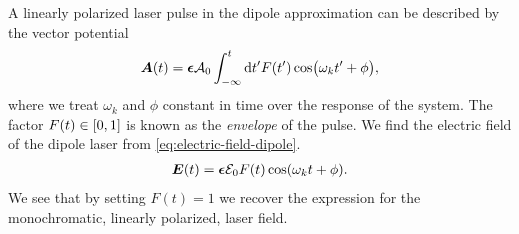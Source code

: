         A linearly polarized laser pulse in the dipole approximation can be
        described by the vector potential \cite{joachain2012atoms}
        \begin{align}
            \boldsymbol{A}(t)
            = \boldsymbol{\epsilon} \mathcal{A}_0
            \int_{-\infty}^{t}
            \dd t'
            F(t')
            \cos(\omega_k t' + \phi),
        \end{align}
        where we treat $\omega_k$ and $\phi$ constant in time over the response
        of the system.
        The factor $F(t) \in \left[ 0, 1 \right]$ is known as the \emph{envelope} of the
        pulse.
        We find the electric field of the dipole laser from
        \autoref{eq:electric-field-dipole}.
        \begin{align}
            \boldsymbol{E}(t)
            = \boldsymbol{\epsilon} \mathcal{E}_0 F(t) \cos(\omega_k t + \phi).
        \end{align}
        We see that by setting $F(t) = 1$ we recover the expression for the
        monochromatic, linearly polarized, laser field.

